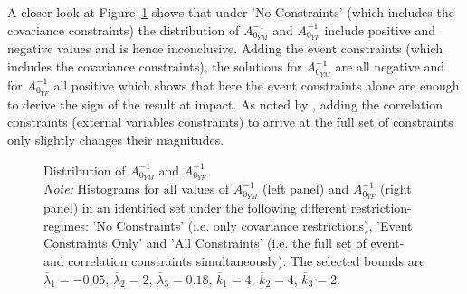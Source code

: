 \documentclass[a4paper,11pt,listof=nochaptergap,oneside,pointednumbers,bibtotoc,bigheadings,liststotoc,hidelinks]{scrbook}
\theoremstyle{mysatz}
\theoremstyle{mydefinition}
\theoremstyle{mytheorem}
\theoremstyle{mybemerkung}
\begin{document}
A closer look at Figure~\ref{fig:distribution_impact_matrices_type1} shows that under 'No Constraints' (which includes the covariance constraints) the distribution of $A_{0_{YM}}^{-1}$ and $A_{0_{YF}}^{-1}$ include positive and negative values and is hence inconclusive. Adding the event constraints (which includes the covariance constraints), the solutions for $A_{0_{YM}}^{-1}$ are all negative and for $A_{0_{YF}}^{-1}$ all positive which shows that here the event constraints alone are enough to derive the sign of the result at impact. As noted by \citet{ludvigsonetal:19}, adding the correlation constraints (external variables constraints) to arrive at the full set of constraints only slightly changes their magnitudes. 


\begin{figure}[!h]
   \centering
   \setlength\fboxsep{0pt}
   \setlength\fboxrule{0pt}
      \caption[Distribution of $A_{0_{YM}}^{-1}$ and $A_{0_{YF}}^{-1}$.]{Distribution of $A_{0_{YM}}^{-1}$ and $A_{0_{YF}}^{-1}$.\\
      \textit{Note:} Histograms for all values of $A_{0_{YM}}^{-1}$ (left panel) and $A_{0_{YF}}^{-1}$ (right panel) in an identified set under the following different restriction-regimes: 'No Constraints' (i.e. only covariance restrictions), 'Event Constraints Only' and 'All Constraints' (i.e. the full set of event- and correlation constraints simultaneously). The selected bounds are $\overline{\lambda}_1 = -0.05$, $\overline{\lambda}_2 = 2$, $\overline{\lambda}_3 = 0.18$, $\overline{k}_1 = 4$, $\overline{k}_2 = 4$, $\overline{k}_3 = 2$.}   \label{fig:distribution_impact_matrices_type1}
\end{figure}
\end{document}
